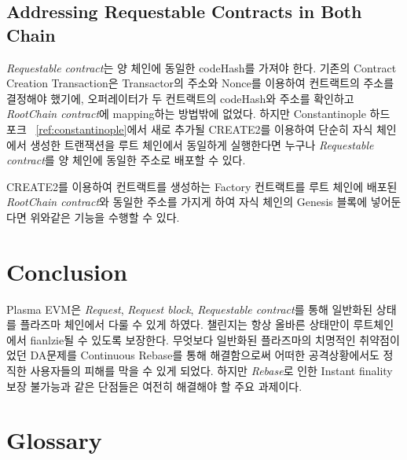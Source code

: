 \documentclass[letterpaper, 11pt]{article}
\begin{document}
\subsection{Addressing Requestable Contracts in Both Chain}
\begin{CJK}{UTF8}{mj}
\emph{Requestable contract}는 양 체인에 동일한 codeHash를 가져야 한다. 기존의 Contract Creation Transaction은 Transactor의 주소와 Nonce를 이용하여 컨트랙트의 주소를 결정해야 했기에, 오퍼레이터가 두 컨트랙트의 codeHash와 주소를 확인하고 \emph{RootChain contract}에 mapping하는 방법밖에 없었다. 하지만 Constantinople 하드 포크 ~\ref{ref:constantinople}에서 새로 추가될 CREATE2를 이용하여 단순히 자식 체인에서 생성한 트랜잭션을 루트 체인에서 동일하게 실행한다면 누구나 \emph{Requestable contract}를 양 체인에 동일한 주소로 배포할 수 있다.

CREATE2를 이용하여 컨트랙트를 생성하는 Factory 컨트랙트를 루트 체인에 배포된 \emph{RootChain contract}와 동일한 주소를 가지게 하여 자식 체인의 Genesis 블록에 넣어둔다면 위와같은 기능을 수행할 수 있다.
\end{CJK}


\section{Conclusion}
\begin{CJK}{UTF8}{mj}
Plasma EVM은 \emph{Request}, \emph{Request block}, \emph{Requestable contract}를 통해 일반화된 상태를 플라즈마 체인에서 다룰 수 있게 하였다. 챌린지는 항상 올바른 상태만이 루트체인에서 fianlzie될 수 있도록 보장한다. 무엇보다 일반화된 플라즈마의 치명적인 취약점이었던 DA문제를 Continuous Rebase를 통해 해결함으로써 어떠한 공격상황에서도 정직한 사용자들의 피해를 막을 수 있게 되었다. 하지만 \emph{Rebase}로 인한 Instant finality 보장 불가능과 같은 단점들은 여전히 해결해야 할 주요 과제이다.
\end{CJK}

\newpage


\appendix
\section{Glossary} \label{appendix:glossary}
\end{document}
